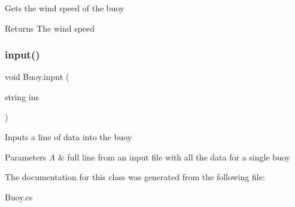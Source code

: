 Gets the wind speed of the buoy \begin{DoxyReturn}{Returns}
The wind speed 
\end{DoxyReturn}
\mbox{\label{class_buoy_adebcdc47416100216797efc05dda77a3}} 
\subsubsection{\texorpdfstring{input()}{input()}}
{\footnotesize\ttfamily void Buoy.\+input (\begin{DoxyParamCaption}\item[{string}]{ins }\end{DoxyParamCaption})\hspace{0.3cm}{\ttfamily [inline]}}

Inputs a line of data into the buoy 
\begin{DoxyParams}{Parameters}
{\em A} & full line from an input file with all the data for a single buoy \\
\hline
\end{DoxyParams}


The documentation for this class was generated from the following file\+:\begin{DoxyCompactItemize}
\item 
Buoy.\+cs\end{DoxyCompactItemize}
